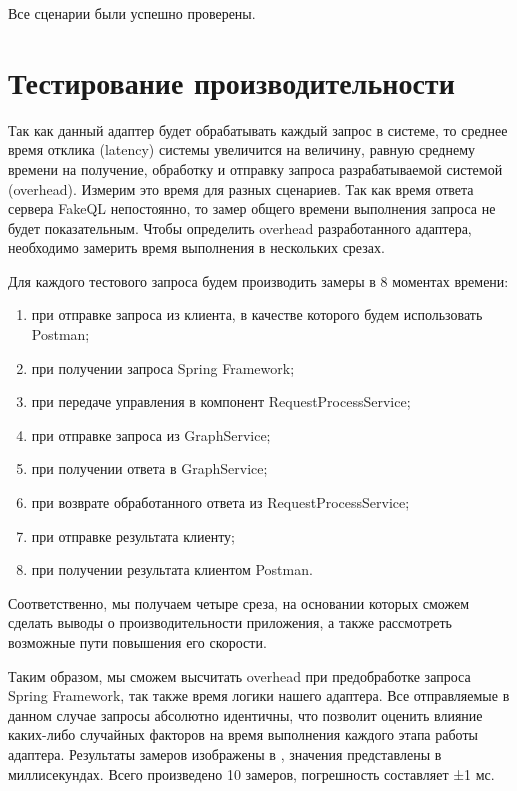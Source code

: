Все сценарии были успешно проверены.

\section{Тестирование производительности} \label{sec:ch4-performance}

Так как данный адаптер будет обрабатывать каждый запрос в системе, то среднее время отклика (latency) системы увеличится на величину, равную среднему времени на получение, обработку и отправку запроса разрабатываемой системой (overhead).
Измерим это время для разных сценариев.
Так как время ответа сервера FakeQL непостоянно, то замер общего времени выполнения запроса не будет показательным.
Чтобы определить overhead разработанного адаптера, необходимо замерить время выполнения в нескольких срезах.

Для каждого тестового запроса будем производить замеры в 8 моментах времени:
\begin{enumerate}
	\item при отправке запроса из клиента, в качестве которого будем использовать Postman;
	\item при получении запроса Spring Framework;
	\item при передаче управления в компонент RequestProcessService;
	\item при отправке запроса из GraphService;
	\item при получении ответа в GraphService;
	\item при возврате обработанного ответа из RequestProcessService;
	\item при отправке результата клиенту;
	\item при получении результата клиентом Postman.
\end{enumerate}
Соответственно, мы получаем четыре среза, на основании которых сможем сделать выводы о производительности приложения, а также рассмотреть возможные пути повышения его скорости.

Таким образом, мы сможем высчитать overhead при предобработке запроса Spring Framework, так также время логики нашего адаптера.
Все отправляемые в данном случае запросы абсолютно идентичны, что позволит оценить влияние каких-либо случайных факторов на время выполнения каждого этапа работы адаптера.
Результаты замеров изображены в , значения представлены в миллисекундах.
Всего произведено 10 замеров, погрешность составляет ±1 мс.

